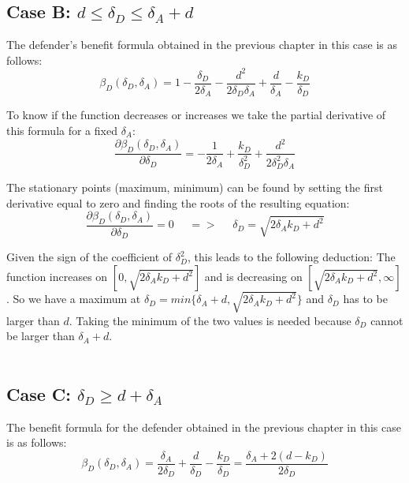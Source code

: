 \subsection*{Case B: $ d \leq\delta_{D} \leq \delta_{A} + d$}
The defender's benefit formula obtained in the previous chapter in this case is as follows:
\begin{equation*}
\beta_{D}(\delta_{D},\delta_{A}) = 1 - \dfrac{\delta_{D}}{2\delta_{A}} - \dfrac{d^{2}}{2\delta_{D}\delta_{A}} + \dfrac{d}{\delta_{A}}  - \dfrac{k_{D}}{\delta_{D}}
\end{equation*}

To know if the function decreases or increases we take the partial derivative of this formula for a fixed $\delta_{A}$:
\begin{equation*}\label{formdelta}
\frac{\partial \beta_{D}(\delta_{D},\delta_{A})}{\partial \delta_{D}} = - \dfrac{1}{2\delta_{A}} + \dfrac{k_{D}}{\delta_{D}^{2}} + \dfrac{d^{2}}{2\delta_{D}^{2}\delta_{A}}
\end{equation*}
 
The stationary points (maximum, minimum) can be found by setting the first derivative equal to zero and finding the roots of the resulting equation:
\begin{equation*}
\frac{\partial \beta_{D}(\delta_{D},\delta_{A})}{\partial \delta_{D}} =0 ~~~~~~ =>~~~~~~ \delta_{D} = \sqrt{2\delta_{A}k_{D} + d^{2}}
\end{equation*}

Given the sign of the coefficient of $\delta_{D}^{2}$, this
leads to the following deduction: The function increases on $[0, \sqrt{2\delta_{A}k_{D} + d^{2}}]$ and is decreasing on $[\sqrt{2\delta_{A}k_{D} + d^{2}}, \infty]$. So we have a maximum at $\delta_{D} = min \{ \delta_{A} +d, \sqrt{2\delta_{A}k_{D} + d^{2}} \} $ and $\delta_{D}$ has to be larger than $d$. Taking the minimum of the two values is needed because $\delta_{D}$ cannot be larger than $\delta_{A} +d$. \\
~~\\


\subsection*{Case C: $\delta_{D} \geq d+\delta_{A} $ }

The benefit formula for the defender obtained in the previous chapter in this case is as follows:
\begin{equation*}
\beta_{D}(\delta_{D},\delta_{A})= \dfrac{\delta_{A}}{2\delta_{D}} + \dfrac{d}{\delta_{D}} - \dfrac{k_{D}}{\delta_{D}} = \dfrac{\delta_{A} + 2 (d-k_{D})}{2\delta_{D}}
\end{equation*}

